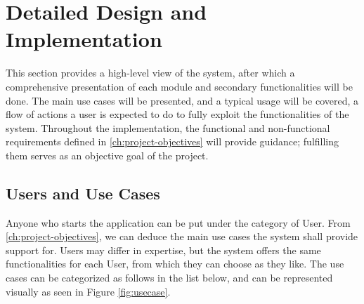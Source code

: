 \chapter{Detailed Design and Implementation} \label{ch:detailed-design-and-implementation}
\pagestyle{fancy}

This section provides a high-level view of the system, after which a comprehensive presentation of each module and secondary functionalities will be done. The main use cases will be presented, and a typical usage will be covered, a flow of actions a user is expected to do to fully exploit the functionalities of the system. Throughout the implementation, the functional and non-functional requirements defined in \autoref{ch:project-objectives} will provide guidance; fulfilling them serves as an objective goal of the project.




\section{Users and Use Cases} \label{sub:users-and-use-cases}

Anyone who starts the application can be put under the category of User. From \autoref{ch:project-objectives}, we can deduce the main use cases the system shall provide support for. Users may differ in expertise, but the system offers the same functionalities for each User, from which they can choose as they like. The use cases can be categorized as follows in the list below, and can be represented visually as seen in Figure \ref{fig:usecase}.

